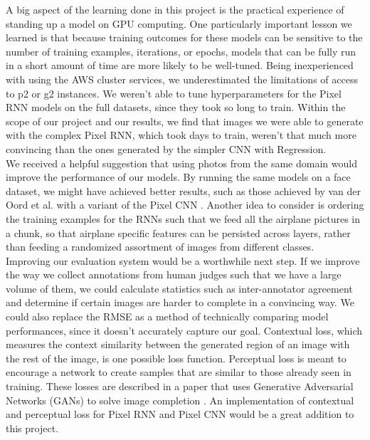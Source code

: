 \documentclass[10pt,twocolumn,letterpaper]{article}
\begin{document}
A big aspect of the learning done in this project is the practical experience of standing up a model on GPU computing. One particularly important lesson we learned is that because training outcomes for these models can be sensitive to the number of training examples, iterations, or epochs, models that can be fully run in a short amount of time are more likely to be well-tuned. Being inexperienced with using the AWS cluster services, we underestimated the limitations of access to p2 or g2 instances. We weren't able to tune hyperparameters for the Pixel RNN models on the full datasets, since they took so long to train. Within the scope of our project and our results, we find that images we were able to generate with the complex Pixel RNN, which took days to train, weren't that much more convincing than the ones generated by the simpler CNN with Regression.\\

We received a helpful suggestion that using photos from the same domain would improve the performance of our models. By running the same models on a face dataset, we might have achieved better results, such as those achieved by van der Oord et al. with a variant of the Pixel CNN \cite{pixelCNN}. Another idea to consider is ordering the training examples for the RNNs such that we feed all the airplane pictures in a chunk, so that airplane specific features can be persisted across layers, rather than feeding a randomized assortment of images from different classes.\\

Improving our evaluation system would be a worthwhile next step. If we improve the way we collect annotations from human judges such that we have a large volume of them, we could calculate statistics such as inter-annotator agreement and determine if certain images are harder to complete in a convincing way. We could also replace the RMSE as a method of technically comparing model performances, since it doesn't accurately capture our goal. Contextual loss, which measures the context similarity between the generated region of an image with the rest of the image, is one possible loss function. Perceptual loss is meant to encourage a network to create samples that are similar to those already seen in training. These losses are described in a paper that uses Generative Adversarial Networks (GANs) to solve image completion \cite{inpaint}. An implementation of contextual and perceptual loss for Pixel RNN and Pixel CNN would be a great addition to this project. \\
\end{document}
